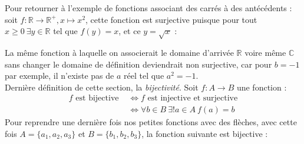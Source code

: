 \documentclass{article}
\newcommand{\R}{\mathbb{R}}
\newcommand{\C}{\mathbb{C}}
\begin{document}
\noindent Pour retourner à l'exemple de fonctions associant des carrés à des antécédents : soit $f : \R \to \R^+, x \mapsto x^2$, cette fonction est surjective puisque pour tout $x \geq 0 \ \exists y \in \R$ tel que $f(y) = x$, et ce $y = \sqrt{x}$ :
\begin{center}
\end{center}
La même fonction à laquelle on associerait le domaine d'arrivée $\R$ voire même $\C$ sans changer le domaine de définition deviendrait non surjective, car pour $b = -1$ par exemple, il n'existe pas de $a$ réel tel que $a^2 = -1$.\\

\noindent Dernière définition de cette section, la \textit{bijectivité}. Soit $f: A \to B$ une fonction :
\begin{align*}
    f \text{ est bijective } &\iff f \text{ est injective et surjective}\\
    &\iff \forall b \in B\ \exists! a \in A \ f(a) = b
\end{align*}
Pour reprendre une dernière fois nos petites fonctions avec des flèches, avec cette fois $A = \{a_1, a_2, a_3\}$ et $B = \{b_1, b_2, b_3\}$, la fonction suivante est bijective :
\end{document}
